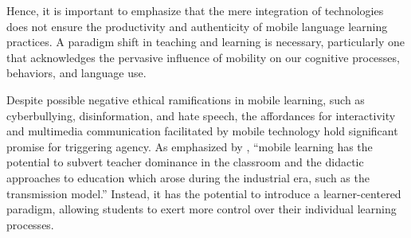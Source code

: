 Hence, it is important to emphasize that the mere integration of technologies does not ensure the productivity and authenticity of mobile language learning practices. A paradigm shift in teaching and learning is necessary, particularly one that acknowledges the pervasive influence of mobility on our cognitive processes, behaviors, and language use.

Despite possible negative ethical ramifications in mobile learning, such as cyberbullying, disinformation, and hate speech, the affordances for interactivity and multimedia communication facilitated by mobile technology hold significant promise for triggering agency. As emphasized by \textcite[p. 299]{andrews2011}, “mobile learning has the potential to subvert teacher dominance in the classroom and the didactic approaches to education which arose during the industrial era, such as the transmission model.” Instead, it has the potential to introduce a learner-centered paradigm, allowing students to exert more control over their individual learning processes.